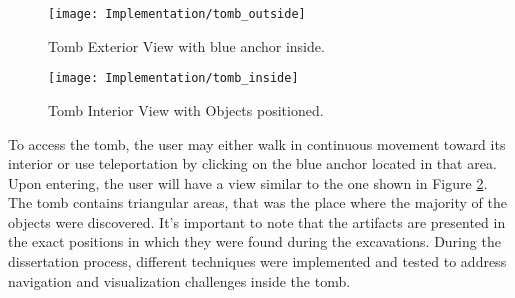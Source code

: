  \begin{figure}[h!]
    \centering
    \texttt{[image: Implementation/tomb\_outside]}
    \caption{Tomb Exterior View with blue anchor inside.}
    \label{fig:tomb_outside}    
\end{figure}

 \begin{figure}[h!]
    \centering
    \texttt{[image: Implementation/tomb\_inside]}
    \caption{Tomb Interior View with Objects positioned.}
    \label{fig:tomb_inside}    
\end{figure}

To access the tomb, the user may either walk in continuous movement toward its interior or use teleportation by clicking on the blue anchor located in that area.
Upon entering, the user will have a view similar to the one shown in Figure \ref{fig:tomb_inside}.
The tomb contains triangular areas, that was the place where the majority of the objects were discovered. 
It's important to note that the artifacts are presented in the exact positions in which they were found during the excavations.
During the dissertation process, different techniques were implemented and tested to address navigation and visualization challenges inside the tomb.

